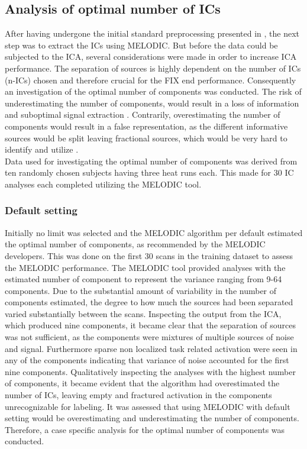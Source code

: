 
\subsection{Analysis of optimal number of ICs}

After having undergone the initial standard preprocessing presented in , the next step was to extract the ICs using MELODIC. But before the data could be subjected to the ICA, several considerations were made in order to increase ICA performance. The separation of sources is highly dependent on the number of ICs (n-ICs) chosen and therefore crucial for the FIX end performance. Consequently an investigation of the optimal number of components was conducted. The risk of underestimating the number of components, would result in a loss of information and suboptimal signal extraction \cite{Beckmann2004}. Contrarily, overestimating the number of components would result in a false representation, as the different informative sources would be split leaving fractional sources, which would be very hard to identify and utilize \cite{Beckmann2004,Li2007}. \\
Data used for investigating the optimal number of components was derived from ten randomly chosen subjects having three heat runs each. This made for 30 IC analyses each completed utilizing the MELODIC tool. 


\subsubsection{Default setting}
Initially no limit was selected and the MELODIC algorithm per default estimated the optimal number of components, as recommended by the MELODIC developers. \cite{FMRIB2016} This was done on the first 30 scans in the training dataset to assess the MELODIC performance. The MELODIC tool provided analyses with the estimated number of component to represent the variance ranging from 9-64 components. Due to the substantial amount of variability in the number of components estimated, the degree to how much the sources had been separated varied substantially between the scans. Inspecting the output from the ICA, which produced nine components, it became clear that the separation of sources was not sufficient, as the components were mixtures of multiple sources of noise and signal. Furthermore sparse non localized task related activation were seen in any of the components indicating that variance of noise accounted for the first nine components. Qualitatively inspecting the analyses with the highest number of components, it became evident that the algorithm had overestimated the number of ICs, leaving empty and fractured activation in the components unrecognizable for labeling. It was assessed that using MELODIC with default setting would be overestimating and underestimating the number of components. Therefore, a case specific analysis for the optimal number of components was conducted. 

